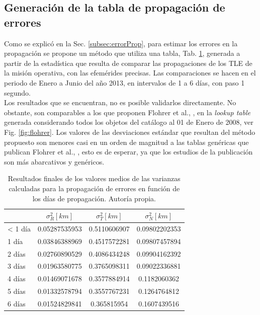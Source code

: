 \subsection*{Generaci\'on de la tabla de propagaci\'on de errores}

Como se explic\'o en la Sec. \ref{subsec:errorProp}, para estimar los errores en la propagaci\'on se propone un m\'etodo que utiliza una tabla, Tab. \ref{tab:resultatabla}, generada a partir de la estad\'istica que resulta de comparar las propagaciones de los TLE de la misi\'on operativa, con las efem\'erides precisas. Las comparaciones se hacen en el periodo de Enero a Junio del a\~no 2013, en intervalos de 1 a 6 d\'ias, con paso 1 segundo.\\
Los resultados que se encuentran, no es posible validarlos directamente. No obstante, son comparables a los que proponen Flohrer et al., \citep{flohrer2008assessment}, en la {\it{lookup table}} generada considerando todos los objetos del cat\'alogo al 01 de Enero de 2008, ver Fig. \ref{fig:flohrer}. Los valores de las desviaciones est\'andar que resultan del m\'etodo propuesto son menores casi en un orden de magnitud a las tablas gen\'ericas que publican Flohrer et al., \citep{flohrer2008assessment}, esto es de esperar, ya que los estudios de la publicaci\'on son m\'as abarcativos y gen\'ericos.\\

\begin{table}[!h]
\centering

\begin{tabular}{|l|c|c|c|}
\hline \hline
\rowcolor{yellow!35}
&$\sigma^{2}_R [km]$ &$\sigma^{2}_T [km]$ &$\sigma^{2}_N [km]$\\
\hline \hline
< 1 d\'ia & 0.05287535953&0.5110606907&0.09802202353\\
\hline
1 d\'ia & 0.03846388969&0.4517572281&0.09807457894\\
\hline
2 d\'ias & 0.02760890529&0.4086434248&0.09904162392\\
\hline
3 d\'ias & 0.01963580775&0.3765098311&0.09022336881\\
\hline
4 d\'ias & 0.01469071678&0.3577884914&0.1182060362\\
\hline
5 d\'ias & 0.01332578794&0.3557767231&0.1264764812\\
\hline
6 d\'ias & 0.01524829841&0.365815954&0.1607439516\\
\hline
\end{tabular}
\caption[Tabla con los valores medios para la propagaci\'on de errores.]{Resultados finales de los valores medios de las varianzas calculadas para la propagaci\'on de errores en funci\'on de los d\'ias de propagaci\'on. Autor\'ia propia.}
\label{tab:resultatabla}
\end{table}

